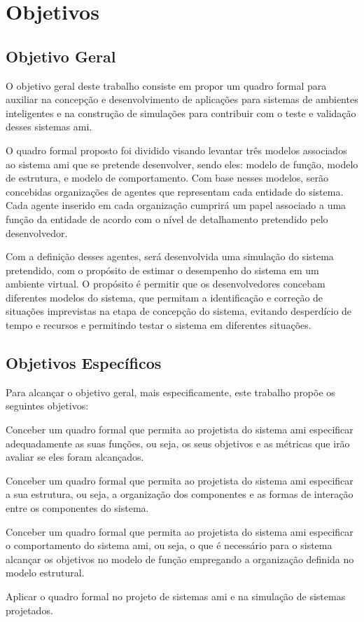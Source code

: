 \section{Objetivos}
\label{sec:objetivos}


\subsection{Objetivo Geral}
\label{sec:objetivo-geral}

    O objetivo geral deste trabalho consiste em propor um quadro formal para auxiliar na concepção e desenvolvimento de aplicações para sistemas de ambientes inteligentes e na construção de simulações para contribuir com o teste e validação desses sistemas \acrshort{ami}.
    
    O quadro formal proposto foi dividido visando levantar três  modelos associados ao sistema \acrshort{ami} que se pretende desenvolver, sendo eles: modelo de função, modelo de estrutura, e modelo de comportamento. Com base nesses modelos, serão concebidas organizações de agentes que representam cada entidade do sistema. Cada agente inserido em cada organização cumprirá um papel associado a uma função da entidade de acordo com o nível de detalhamento pretendido pelo desenvolvedor. 
    
    Com a definição desses agentes, será desenvolvida uma simulação do sistema pretendido, com o propósito de estimar o desempenho do sistema em um ambiente virtual. O propósito é permitir que os desenvolvedores concebam diferentes modelos do sistema, que permitam a identificação e correção de situações imprevistas na etapa de concepção do sistema, evitando desperdício de tempo e recursos e permitindo testar o sistema em diferentes situações.  

\subsection{Objetivos Específicos}
\label{sec:objetivos-especificos}

    Para alcançar o objetivo geral, mais especificamente, este trabalho propõe os seguintes objetivos:
    
    \begin{alineas}
		\item Conceber um quadro formal que permita ao projetista do sistema \acrshort{ami} especificar adequadamente as suas funções, ou seja, os seus objetivos e as métricas que irão avaliar se eles foram alcançados. 
		\item Conceber um quadro formal que permita ao projetista do sistema \acrshort{ami} especificar a sua estrutura, ou seja, a organização dos componentes e as formas de interação entre os componentes do sistema.
		\item Conceber um quadro formal que permita ao projetista do sistema \acrshort{ami} especificar o comportamento do sistema \acrshort{ami}, ou seja, o que é necessário para o sistema alcançar os objetivos no modelo de função empregando a organização definida no modelo estrutural.
		\item Aplicar o quadro formal no projeto de sistemas \acrshort{ami} e na simulação de sistemas projetados.
	\end{alineas}